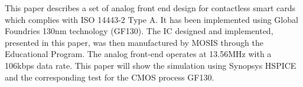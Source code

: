 This paper describes a set of analog front end design for contactless smart cards which complies with ISO 14443-2 Type A. It has been implemented using Global Foundries 130nm technology (GF130). The IC designed and implemented, presented in this paper, was then manufactured by MOSIS through the Educational Program. The analog front-end operates at 13.56MHz with a 106kbps data rate. This paper will show the simulation using Synopsys HSPICE and the corresponding test for the CMOS process GF130.